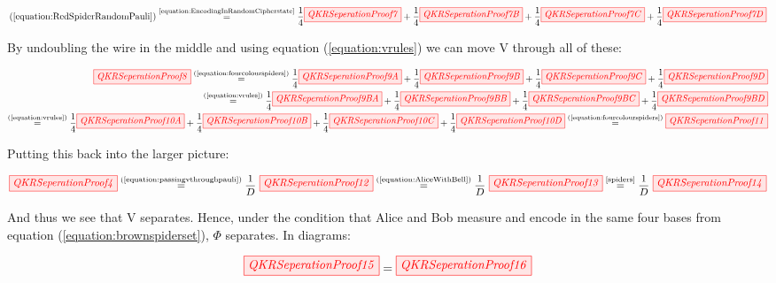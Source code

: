 \documentclass[]{article}
\newcommand{\equaltext}[1]{\ensuremath{\stackrel{\text{#1}}{=}}}
\begin{document}
\begin{equation}
	\label{equation:fourcolourspiders}
	(\ref{equation:RedSpiderRandomPauli}) \equaltext{\ref{equation:EncodingInRandomCipherstate}} \frac{1}{4}\tikzfig{QKRSeperationProof7} + \frac{1}{4} \tikzfig{QKRSeperationProof7B} + \frac{1}{4} \tikzfig{QKRSeperationProof7C} + \frac{1}{4} \tikzfig{QKRSeperationProof7D}
\end{equation}

By undoubling the wire in the middle and using equation (\ref{equation:vrules}) we can move V through all of these:

\begin{equation}
\label{equation:passingvthroughpauli}
\begin{aligned}
	 \tikzfig{QKRSeperationProof8} \equaltext{(\ref{equation:fourcolourspiders})} \frac{1}{4}\tikzfig{QKRSeperationProof9A} + \frac{1}{4} \tikzfig{QKRSeperationProof9B} + \frac{1}{4} \tikzfig{QKRSeperationProof9C} + \frac{1}{4} \tikzfig{QKRSeperationProof9D} \\ \equaltext{(\ref{equation:vrules})}
	 \frac{1}{4}\tikzfig{QKRSeperationProof9BA} + \frac{1}{4} \tikzfig{QKRSeperationProof9BB} + \frac{1}{4} \tikzfig{QKRSeperationProof9BC} + \frac{1}{4} \tikzfig{QKRSeperationProof9BD} \\
	 \equaltext{(\ref{equation:vrules})}
	  \frac{1}{4}\tikzfig{QKRSeperationProof10A} + \frac{1}{4} \tikzfig{QKRSeperationProof10B} + \frac{1}{4} \tikzfig{QKRSeperationProof10C} + \frac{1}{4} \tikzfig{QKRSeperationProof10D} \equaltext{(\ref{equation:fourcolourspiders})} \tikzfig{QKRSeperationProof11}
\end{aligned}
\end{equation}

Putting this back into the larger picture:

\begin{equation}
	\label{equation:vpassingthrough}
	\tikzfig{QKRSeperationProof4} \equaltext{(\ref{equation:passingvthroughpauli})} \frac{1}{D}~ \tikzfig{QKRSeperationProof12} \equaltext{(\ref{equation:AliceWithBell})}	\frac{1}{D}~ \tikzfig{QKRSeperationProof13} \equaltext{\ref{spiders}} \frac{1}{D}~ \tikzfig{QKRSeperationProof14}
\end{equation}

And thus we see that V separates. Hence, under the condition that Alice and Bob measure and encode in the same four bases from equation (\ref{equation:brownspiderset}), $\Phi$ separates. In diagrams:

\begin{equation}
\label{equation:QKRSeparates}
\tikzfig{QKRSeperationProof15} = \tikzfig{QKRSeperationProof16}
\end{equation}
\end{document}
